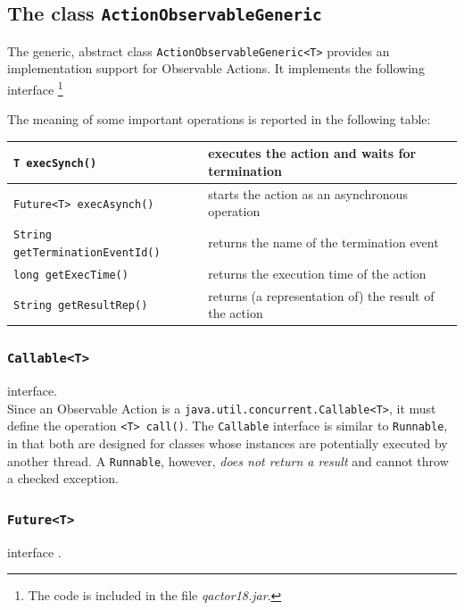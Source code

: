 \subsection{The class \texttt{ActionObservableGeneric}}

The generic, abstract class \texttt{ActionObservableGeneric<T>} provides an implementation support for Observable Actions. It implements the following interface \footnote{The code is included in the file \textit{qactor18.jar}.}  



The meaning of some important operations is reported in the following table:

\medskip 
\begin{tabular}{|l|l|}
\hline
\texttt{T execSynch()} & executes the action and waits for termination \\ 
\hline 
\texttt{Future<T> execAsynch()} & starts the action as an asynchronous operation \\ 
\hline 
\texttt{String getTerminationEventId()} & returns the name of the termination event\\ 
\hline 
\texttt{long getExecTime()} & returns the execution time of the action \\ 
\hline 
\texttt{String getResultRep()} & returns (a representation of) the result of the action\\ 
\hline 
\end{tabular} 

    

\subsubsection{\texttt{Callable<T>}} interface.\\
 
Since an Observable Action is a \texttt{java.util.concurrent.Callable<T>}, it must define the operation \texttt{<T> call()}.
The \texttt{Callable} interface is similar to \texttt{Runnable}, in that both are designed for classes whose instances are potentially executed by another thread. A \texttt{Runnable}, however, \textit{does not return a result} and cannot throw a checked exception.

\subsubsection{\texttt{Future<T>}} interface .\\

